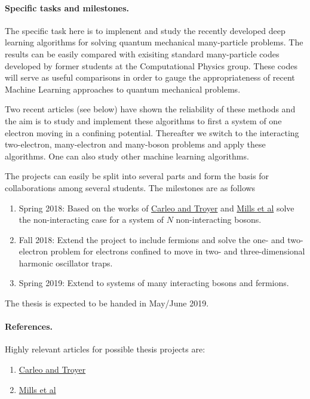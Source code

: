 \documentclass[%
oneside,                 %
final,                   %
10pt]{article}
\begin{document}
\paragraph{Specific tasks and milestones.}
The specific task here is to implenent and study the recently developed
deep learning algorithms for solving quantum mechanical many-particle
problems. The results can  be easily compared with exisiting standard
many-particle codes developed by former students at the Computational
Physics group. These codes will serve as useful comparisons in order
to gauge the appropriateness of recent Machine Learning approaches to
quantum mechanical problems.

Two recent articles (see below) have shown the reliability of these methods and
the aim is to study and implement these algorithms to first a system
of one electron moving in a confining potential. Thereafter we switch
to the interacting two-electron, many-electron and many-boson problems and apply
these algorithms.  One can also study other machine learning algorithms. 


The projects can easily be split into several parts and form the basis for collaborations among several students. The milestones are as follows
\begin{enumerate}
\item Spring 2018: Based on the works of \href{{http://science.sciencemag.org/content/355/6325/602}}{Carleo and Troyer} and \href{{https://journals.aps.org/pra/abstract/10.1103/PhysRevA.96.042113}}{Mills et al} solve the non-interacting case for a system of $N$ non-interacting bosons.

\item Fall 2018: Extend the project to include fermions and solve the one- and two-electron problem for electrons confined to move in two- and three-dimensional harmonic oscillator traps. 

\item Spring 2019: Extend to systems of many interacting bosons and fermions.
\end{enumerate}

\noindent
The thesis is expected to be handed in May/June  2019.

\paragraph{References.}
Highly relevant articles for possible thesis projects are:

\begin{enumerate}
\item \href{{http://science.sciencemag.org/content/355/6325/602}}{Carleo and Troyer} 

\item \href{{https://journals.aps.org/pra/abstract/10.1103/PhysRevA.96.042113}}{Mills et al} 
\end{enumerate}

\noindent


\end{document}
